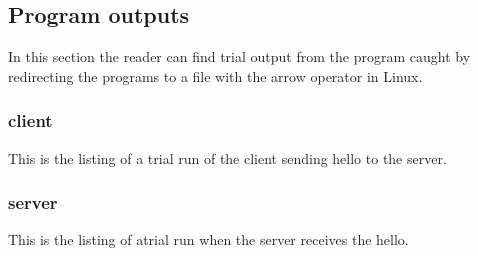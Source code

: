\subsection{Program outputs}\label{subsec:prog_output}
In this section the reader can find trial output from the program caught by redirecting the programs to a file with the arrow operator in Linux.  
\subsubsection{client}\label{subsubsec:client_out}
This is the listing of a trial run of the client sending hello to the server.
{\footnotesize
}
\subsubsection{server}\label{subsubsec:server_out}
This is the listing of atrial run when the server receives the hello.
{\footnotesize
}